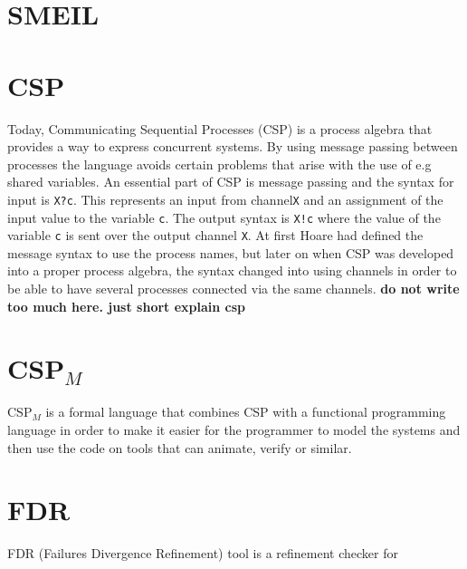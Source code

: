 \documentclass[a4paper]{report}
\newcommand{\cspm}{CSP$_M$ }
\begin{document}
\section{SMEIL}
\section{CSP}
Today, Communicating Sequential Processes (CSP) is a process algebra that provides a way to express concurrent systems. By using message passing between processes the language avoids certain problems that arise with the use of e.g shared variables. An essential part of CSP is message passing and the syntax for input is \texttt{X?c}. This represents an input from channel\texttt{X} and an assignment of the input value to the variable \texttt{c}. The output syntax is \texttt{X!c} where the value of the variable \texttt{c} is sent over the output channel \texttt{X}. At first Hoare had defined the message syntax to use the process names, but later on when CSP was developed into a proper process algebra, the syntax changed into using channels in order to be able to have several processes connected via the same channels.   \textbf{do not write too much here. just short explain csp}
\section{\cspm{}}
\cspm is a formal language that combines CSP with a functional programming language in order to make it easier for the programmer to model the systems and then use the code on tools that can animate, verify or similar.
\section{FDR}
FDR (Failures Divergence Refinement) tool is a refinement checker for
\end{document}
